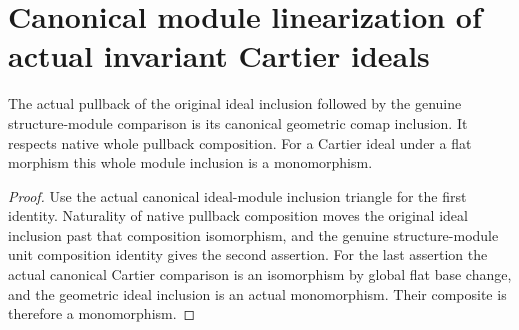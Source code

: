 \section{Canonical module linearization of actual invariant Cartier ideals}
\begin{lemma}
\label{lem:cartier-whole-pullback-inclusion}
\leanok
{}
The actual pullback of the original ideal inclusion followed by the genuine
structure-module comparison is its canonical geometric comap inclusion.
It respects native whole pullback composition. For a Cartier ideal under
a flat morphism this whole module inclusion is a monomorphism.
\end{lemma}
\begin{proof}
Use the actual canonical ideal-module inclusion triangle for the first
identity. Naturality of native pullback composition moves the original
ideal inclusion past that composition isomorphism, and the genuine
structure-module unit composition identity gives the second assertion.
For the last assertion the actual canonical Cartier comparison is an
isomorphism by global flat base change, and the geometric ideal inclusion
is an actual monomorphism. Their composite is therefore a monomorphism.
\end{proof}

